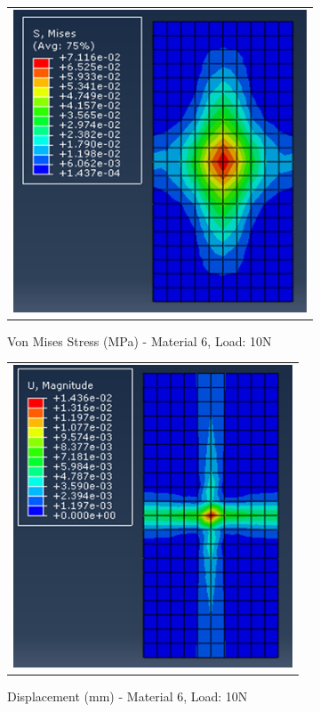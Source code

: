 \documentclass[a4paper,12pt]{article}
\numberwithin{equation}{section}
\numberwithin{figure}{section}
\begin{document}
\begin{figure}[H]
  \centering
  \begin{tabular}{@{}c@{}}
    \includegraphics[width=0.7\linewidth,height=255pt]{Results/Point Loading/M6_VMS_L2_new.png} \\
  \end{tabular}
  \caption{Von Mises Stress (MPa) - Material 6, Load: 10N}
\end{figure}

\begin{figure}[H]
  \centering
  \begin{tabular}{@{}c@{}}
    \includegraphics[width=0.7\linewidth,height=255pt]{Results/Point Loading/M6_DIS_L2_new.png} \\
  \end{tabular}
  \caption{Displacement (mm) - Material 6, Load: 10N}
\end{figure}
\end{document}
